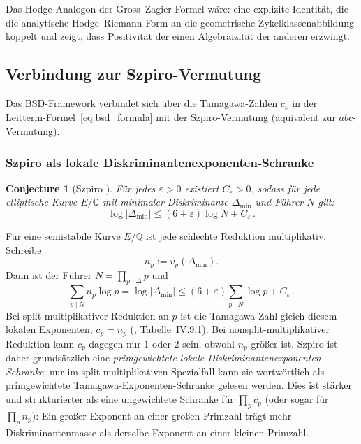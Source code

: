 \documentclass[aps,prd,twocolumn,superscriptaddress,nofootinbib,floatfix]{revtex4-2}
\newtheorem{conjecture}[theorem]{Conjecture}
\theoremstyle{definition}
\theoremstyle{remark}
\begin{document}
Das Hodge-Analogon der Gross--Zagier-Formel wäre: eine explizite Identität, die die \glqq analytische\grqq{} Hodge--Riemann-Form an die \glqq geometrische\grqq{} Zykelklassenabbildung koppelt und zeigt, dass Positivität der einen Algebraizität der anderen erzwingt.

\subsection{Verbindung zur Szpiro-Vermutung}
\label{sec:szpiro}

Das BSD-Framework verbindet sich über die Tamagawa-Zahlen $c_p$ in der Leitterm-Formel~\eqref{eq:bsd_formula} mit der Szpiro-Vermutung (äquivalent zur $abc$-Vermutung).

\subsubsection{Szpiro als lokale Diskriminantenexponenten-Schranke}

\begin{conjecture}[Szpiro {\cite{Szpiro1981}}]
\label{conj:szpiro}
Für jedes $\varepsilon > 0$ existiert $C_\varepsilon > 0$, sodass für jede elliptische Kurve $E/\mathbb{Q}$ mit minimaler Diskriminante $\Delta_{\min}$ und Führer $N$ gilt:
\begin{equation}
\log|\Delta_{\min}| \leq (6+\varepsilon)\log N + C_\varepsilon\,.
\label{eq:szpiro}
\end{equation}
\end{conjecture}

Für eine semistabile Kurve $E/\mathbb{Q}$ ist jede schlechte Reduktion multiplikativ. Schreibe
\[
  n_p := v_p(\Delta_{\min}) .
\]
Dann ist der Führer $N=\prod_{p\mid\Delta}p$ und
\begin{equation}
\sum_{p\mid N} n_p\log p
= \log|\Delta_{\min}|
\leq (6+\varepsilon)\sum_{p\mid N}\log p + C_\varepsilon\,.
\label{eq:szpiro_tamagawa}
\end{equation}
Bei split-multiplikativer Reduktion an $p$ ist die Tamagawa-Zahl gleich diesem lokalen Exponenten, $c_p=n_p$ (\cite{Silverman2009}, Tabelle~IV.9.1). Bei nonsplit-multiplikativer Reduktion kann $c_p$ dagegen nur $1$ oder $2$ sein, obwohl $n_p$ größer ist. Szpiro ist daher grundsätzlich eine \emph{primgewichtete lokale Diskriminantenexponenten-Schranke}; nur im split-multiplikativen Spezialfall kann sie wortwörtlich als primgewichtete Tamagawa-Exponenten-Schranke gelesen werden. Dies ist stärker und strukturierter als eine ungewichtete Schranke für $\prod_p c_p$ (oder sogar für $\prod_p n_p$): Ein großer Exponent an einer großen Primzahl trägt mehr Diskriminantenmasse als derselbe Exponent an einer kleinen Primzahl.
\end{document}

